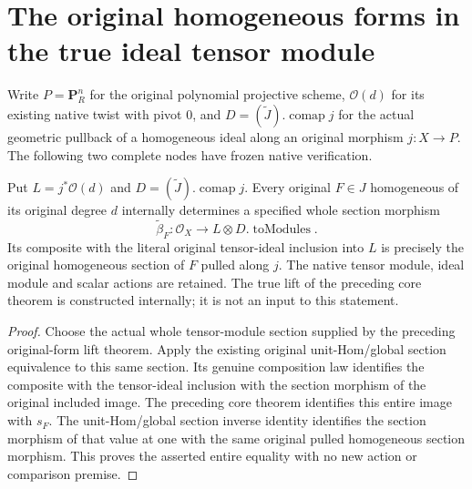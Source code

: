 \section{The original homogeneous forms in the true ideal tensor module}

Write $P=\mathbf P_R^n$ for the original polynomial projective scheme,
$\mathcal O(d)$ for its existing native twist with pivot $0$, and
$D=(\widetilde J).\operatorname{comap}j$ for the actual geometric pullback
of a homogeneous ideal along an original morphism $j:X\to P$.
The following two complete nodes have frozen native verification.

\begin{theorem}
\label{thm:resume-original-form-ideal-tensor-section}
\leanok
Put $L=j^*\mathcal O(d)$ and $D=(\widetilde J).\operatorname{comap}j$.
Every original $F\in J$ homogeneous of its original degree $d$ internally
determines a specified whole section morphism
\[
 \widetilde\beta_F:\mathcal O_X\longrightarrow
 L\otimes D.\operatorname{toModules}.
\]
Its composite with the literal original tensor-ideal inclusion into $L$
is precisely the original homogeneous section of $F$ pulled along $j$.
The native tensor module, ideal module and scalar actions are retained.
The true lift of the preceding core theorem is constructed internally;
it is not an input to this statement.
\end{theorem}
\begin{proof}
Choose the actual whole tensor-module section supplied by the preceding
original-form lift theorem.  Apply the existing original unit-Hom/global
section equivalence to this same section.  Its genuine composition law
identifies the composite with the tensor-ideal inclusion with the section
morphism of the original included image.  The preceding core theorem
identifies this entire image with $s_F$.  The unit-Hom/global section
inverse identity identifies the section morphism of that value at one
with the same original pulled homogeneous section morphism.  This proves
the asserted entire equality with no new action or comparison premise.
\end{proof}

